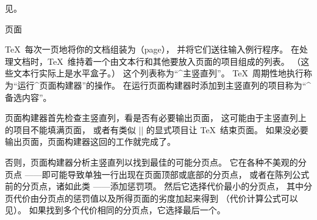 {{{{{{{{{{%

{}
见。
\endconcept


\concept 页面

\TeX\ 每次一页地将你的文档组装为（page），
并将它们送往输入例行程序。
在处理文档时，\TeX\ 维持着一个由文本行和其他要放入页面的项目组成的列表。%
（这些文本行实际上是水平盒子。）
这个列表称为“^{主竖直列}”。
\TeX\ 周期性地执行称为“运行^{页面构建器}”的操作。
在运行页面构建器时添加到主竖直列的项目称为“^{备选内容}”。

页面构建器首先检查主竖直列，看是否有必要输出页面，
这可能由于主竖直列上的项目不能填满页面，
或者有类似 |\eject| \ctsref\eject 的显式项目让 \TeX\ 结束页面。
如果没必要输出页面，页面构建器这回的工作就完成了。

否则，页面构建器分析主竖直列以找到最佳的可能分页点。
它在各种不美观的分页点
——即可能导致单独一行出现在页面顶部或底部的分页点，
或者在陈列公式前的分页点，诸如此类
——添加惩罚项。
然后它选择代价最小的分页点，
其中分页代价由分页点的惩罚值以及所得页面的劣度加起来得到
（代价计算公式可以见）。
如果找到多个代价相同的分页点，它选择最后一个。

}}}}}}}}}}
